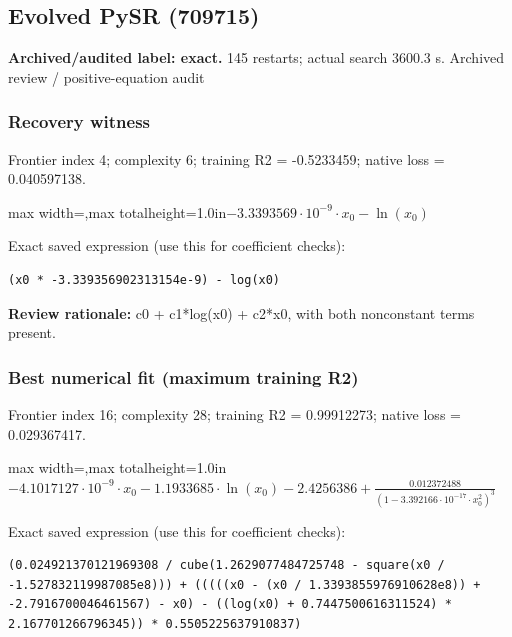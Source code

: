 \documentclass[10pt,letterpaper,landscape]{article}
\begin{document}
\begin{minipage}[t]{0.485\textwidth}
\subsection*{Evolved PySR (709715)}
\textbf{Archived/audited label: exact.} 145 restarts; actual search 3600.3 s.
{\small Archived review / positive-equation audit}
\subsubsection*{Recovery witness}
Frontier index 4; complexity 6; training R2 = -0.5233459; native loss = 0.040597138.
\begin{center}\begin{adjustbox}{max width=\linewidth,max totalheight=1.0in}$\displaystyle - 3.3393569 \cdot 10^{-9} \cdot x_{0} - \ln{\left(x_{0} \right)}$\end{adjustbox}\end{center}
{\scriptsize Exact saved expression (use this for coefficient checks):}
\begin{lstlisting}
(x0 * -3.339356902313154e-9) - log(x0)
\end{lstlisting}
{\small\textbf{Review rationale:} c0 + c1*log(x0) + c2*x0, with both nonconstant terms present.}
\subsubsection*{Best numerical fit (maximum training R2)}
Frontier index 16; complexity 28; training R2 = 0.99912273; native loss = 0.029367417.
\begin{center}\begin{adjustbox}{max width=\linewidth,max totalheight=1.0in}$\displaystyle - 4.1017127 \cdot 10^{-9} \cdot x_{0} - 1.1933685 \cdot \ln{\left(x_{0} \right)} - 2.4256386 + \frac{0.012372488}{\left(1 - 3.392166 \cdot 10^{-17} \cdot x_{0}^{2}\right)^{3}}$\end{adjustbox}\end{center}
{\scriptsize Exact saved expression (use this for coefficient checks):}
\begin{lstlisting}
(0.024921370121969308 / cube(1.2629077484725748 - square(x0 / -1.527832119987085e8))) + (((((x0 - (x0 / 1.3393855976910628e8)) + -2.7916700046461567) - x0) - ((log(x0) + 0.7447500616311524) * 2.167701266796345)) * 0.5505225637910837)
\end{lstlisting}
\end{minipage}
\clearpage{}\label{bode-10000}
\end{document}
